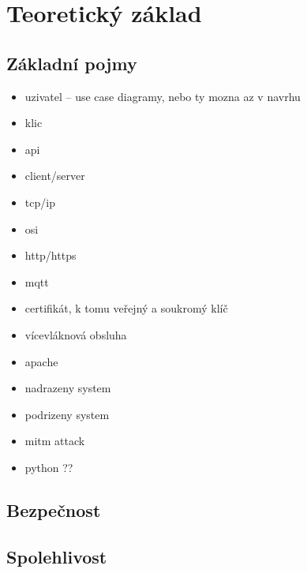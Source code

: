 \chapter{Teoretický základ}
\label{sec:te}

\section{Základní pojmy}

\begin{itemize}
    \item uzivatel -- use case diagramy, nebo ty mozna az v navrhu
    \item klic
    \item api
    \item client/server
    \item tcp/ip
    \item osi
    \item http/https
    \item mqtt
    \item certifikát, k tomu veřejný a soukromý klíč
    \item vícevláknová obsluha
    \item apache
    \item nadrazeny system
    \item podrizeny system
    \item mitm attack
    \item python ??
\end{itemize}

\section{Bezpečnost}

\section{Spolehlivost}